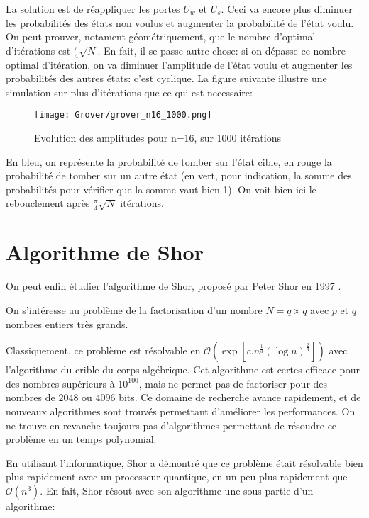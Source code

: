 La solution est de réappliquer les portes $U_w$ et $U_s$. Ceci va encore plus diminuer les probabilités des états non voulus et augmenter la probabilité de l'état voulu.
On peut prouver, notament géométriquement, que le nombre d'optimal d'itérations est $\frac{\pi}{4}\sqrt{N}$. En fait, il se passe autre chose: si on dépasse ce nombre optimal d'itération, on va diminuer l'amplitude de l'état voulu et augmenter les probabilités des autres états: c'est cyclique. La figure suivante illustre une simulation sur plus d'itérations que ce qui est necessaire:

\begin{figure}[htbp]
  \centering
  \texttt{[image: Grover/grover\_n16\_1000.png]}
  \caption{Evolution des amplitudes pour n=16, sur 1000 itérations}
\end{figure}

En bleu, on représente la probabilité de tomber sur l'état cible, en rouge la probabilité de tomber sur un autre état (en vert, pour indication, la somme des probabilités pour vérifier que la somme vaut bien 1). On voit bien ici le rebouclement après $\frac{\pi}{4}\sqrt{N}$ itérations.

\section{Algorithme de Shor}

On peut enfin étudier l'algorithme de Shor, proposé par Peter Shor en 1997 \cite{Shor97}.

\begin{pb}
  On s'intéresse au problème de la factorisation d'un nombre $N=q \times q$ avec $p$ et $q$ nombres entiers très grands.
\end{pb}

Classiquement, ce problème est résolvable en $\mathcal{O}(\exp{[c . n^{\frac{1}{3}} (\log n)^{\frac{2}{3}} ]})$ avec l'algorithme du crible du corps algébrique. Cet algorithme est certes efficace pour des nombres supérieurs à $10^{100}$, mais ne permet pas de factoriser pour des nombres de $2048$ ou $4096$ bits. Ce domaine de recherche avance rapidement, et de nouveaux algorithmes sont trouvés permettant d'améliorer les performances. On ne trouve en revanche toujours pas d'algorithmes permettant de résoudre ce problème en un temps polynomial.

En utilisant l'informatique, Shor a démontré que ce problème était résolvable bien plus rapidement avec un processeur quantique, en un peu plus rapidement que $\mathcal{O}(n^3)$. En fait, Shor résout avec son algorithme une sous-partie d'un algorithme:

